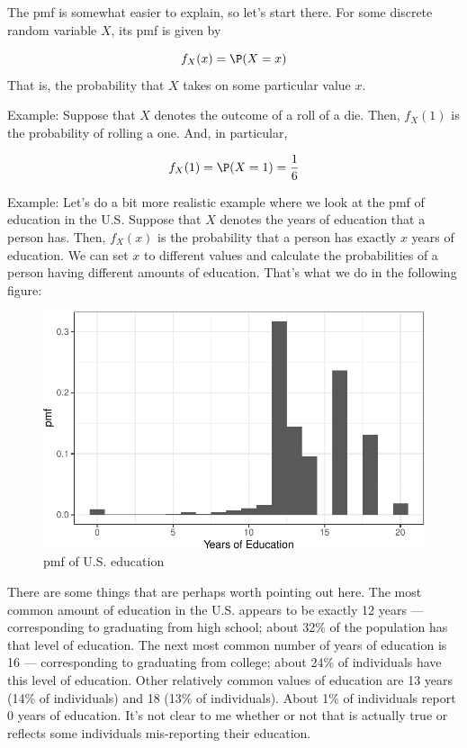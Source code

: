 \documentclass[
  letterpaper,
  DIV=11,
  numbers=noendperiod]{scrreprt}
\begin{document}
The pmf is somewhat easier to explain, so let's start there. For some
discrete random variable \(X\), its pmf is given by

\[
  f_X(x) = \P(X=x)
\] That is, the probability that \(X\) takes on some particular value
\(x\).

{Example: } Suppose that \(X\) denotes the outcome of a roll of a die.
Then, \(f_X(1)\) is the probability of rolling a one. And, in
particular,

\[
  f_X(1) = \P(X=1) = \frac{1}{6}
\]

{Example: } Let's do a bit more realistic example where we look at the
pmf of education in the U.S. Suppose that \(X\) denotes the years of
education that a person has. Then, \(f_X(x)\) is the probability that a
person has exactly \(x\) years of education. We can set \(x\) to
different values and calculate the probabilities of a person having
different amounts of education. That's what we do in the following
figure:

\begin{figure}[H]

{\centering \includegraphics{03-random_variables_files/figure-pdf/unnamed-chunk-3-1.pdf}

}

\caption{pmf of U.S. education}

\end{figure}%

There are some things that are perhaps worth pointing out here. The most
common amount of education in the U.S. appears to be exactly 12 years
--- corresponding to graduating from high school; about 32\% of the
population has that level of education. The next most common number of
years of education is 16 --- corresponding to graduating from college;
about 24\% of individuals have this level of education. Other relatively
common values of education are 13 years (14\% of individuals) and 18
(13\% of individuals). About 1\% of individuals report 0 years of
education. It's not clear to me whether or not that is actually true or
reflects some individuals mis-reporting their education.
\end{document}
